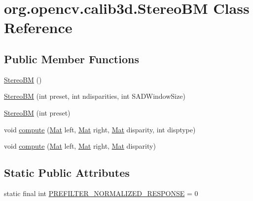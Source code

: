 \hypertarget{classorg_1_1opencv_1_1calib3d_1_1_stereo_b_m}{}\section{org.\+opencv.\+calib3d.\+Stereo\+BM Class Reference}
\label{classorg_1_1opencv_1_1calib3d_1_1_stereo_b_m}
\subsection*{Public Member Functions}
\begin{DoxyCompactItemize}
\item 
\mbox{\hyperlink{classorg_1_1opencv_1_1calib3d_1_1_stereo_b_m_acabf14c02b9ecb03e9e642284f0dfa81}{Stereo\+BM}} ()
\item 
\mbox{\hyperlink{classorg_1_1opencv_1_1calib3d_1_1_stereo_b_m_af541fc22f204f29fa8a8a7585fb7d588}{Stereo\+BM}} (int preset, int ndisparities, int S\+A\+D\+Window\+Size)
\item 
\mbox{\hyperlink{classorg_1_1opencv_1_1calib3d_1_1_stereo_b_m_a6720bd533e4f05bc35092c955882eb52}{Stereo\+BM}} (int preset)
\item 
void \mbox{\hyperlink{classorg_1_1opencv_1_1calib3d_1_1_stereo_b_m_a5d60b89080ccec2d781e2b1e4c3b5571}{compute}} (\mbox{\hyperlink{classorg_1_1opencv_1_1core_1_1_mat}{Mat}} left, \mbox{\hyperlink{classorg_1_1opencv_1_1core_1_1_mat}{Mat}} right, \mbox{\hyperlink{classorg_1_1opencv_1_1core_1_1_mat}{Mat}} disparity, int disptype)
\item 
void \mbox{\hyperlink{classorg_1_1opencv_1_1calib3d_1_1_stereo_b_m_a0cdb853d83f15c94bb05ac4e00111236}{compute}} (\mbox{\hyperlink{classorg_1_1opencv_1_1core_1_1_mat}{Mat}} left, \mbox{\hyperlink{classorg_1_1opencv_1_1core_1_1_mat}{Mat}} right, \mbox{\hyperlink{classorg_1_1opencv_1_1core_1_1_mat}{Mat}} disparity)
\end{DoxyCompactItemize}
\subsection*{Static Public Attributes}
\begin{DoxyCompactItemize}
\item 
static final int \mbox{\hyperlink{classorg_1_1opencv_1_1calib3d_1_1_stereo_b_m_ad7e163278bb28f109a0e3031d21b2cc6}{P\+R\+E\+F\+I\+L\+T\+E\+R\+\_\+\+N\+O\+R\+M\+A\+L\+I\+Z\+E\+D\+\_\+\+R\+E\+S\+P\+O\+N\+SE}} = 0
\end{DoxyCompactItemize}
